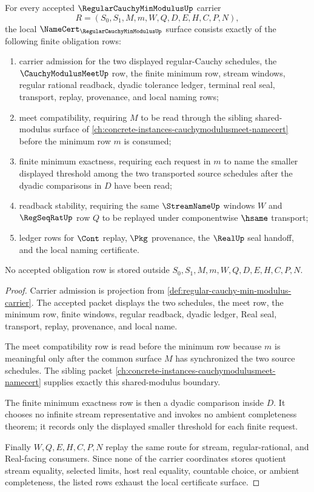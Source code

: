 \begin{theorem}\label{thm:regular-cauchy-min-modulus-namecert-obligations}
For every accepted $\RegularCauchyMinModulusUp$ carrier
$$
R=(S_0,S_1,M,m,W,Q,D,E,H,C,P,N),
$$
the local $\NameCert_{\RegularCauchyMinModulusUp}$ surface consists exactly of the following finite obligation rows:
\begin{enumerate}
\item carrier admission for the two displayed regular-Cauchy schedules, the $\CauchyModulusMeetUp$ row, the finite minimum row, stream windows, regular rational readback, dyadic tolerance ledger, terminal real seal, transport, replay, provenance, and local naming rows;
\item meet compatibility, requiring $M$ to be read through the sibling shared-modulus surface of \autoref{ch:concrete-instances-cauchymodulusmeet-namecert} before the minimum row $m$ is consumed;
\item finite minimum exactness, requiring each request in $m$ to name the smaller displayed threshold among the two transported source schedules after the dyadic comparisons in $D$ have been read;
\item readback stability, requiring the same $\StreamNameUp$ windows $W$ and $\RegSeqRatUp$ row $Q$ to be replayed under componentwise $\hsame$ transport;
\item ledger rows for $\Cont$ replay, $\Pkg$ provenance, the $\RealUp$ seal handoff, and the local naming certificate.
\end{enumerate}
No accepted obligation row is stored outside $S_0,S_1,M,m,W,Q,D,E,H,C,P,N$.
\end{theorem}
\begin{proof}
Carrier admission is projection from \autoref{def:regular-cauchy-min-modulus-carrier}. The accepted packet displays the two schedules, the meet row, the minimum row, finite windows, regular readback, dyadic ledger, Real seal, transport, replay, provenance, and local name.

The meet compatibility row is read before the minimum row because $m$ is meaningful only after the common surface $M$ has synchronized the two source schedules. The sibling packet \autoref{ch:concrete-instances-cauchymodulusmeet-namecert} supplies exactly this shared-modulus boundary.

The finite minimum exactness row is then a dyadic comparison inside $D$. It chooses no infinite stream representative and invokes no ambient completeness theorem; it records only the displayed smaller threshold for each finite request.

Finally $W,Q,E,H,C,P,N$ replay the same route for stream, regular-rational, and Real-facing consumers. Since none of the carrier coordinates stores quotient stream equality, selected limits, host real equality, countable choice, or ambient completeness, the listed rows exhaust the local certificate surface.
\end{proof}

